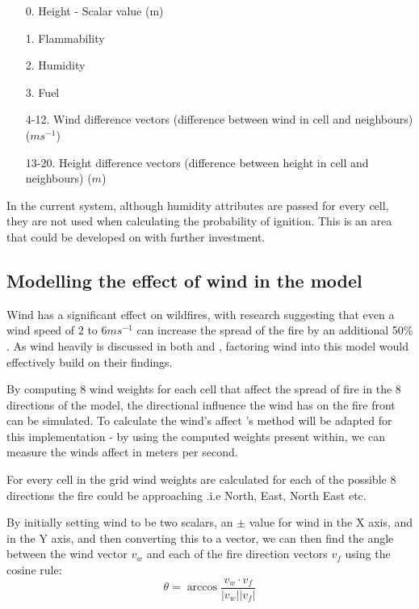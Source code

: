 \documentclass[11pt, a4paper, titlepage]{article}
\begin{document}
\begin{itemize}
  \item [0.] Height - Scalar value (m)
  \item [1.] Flammability
  \item [2.] Humidity
  \item [3.] Fuel
  \item [4-12.] Wind difference vectors (difference between wind in cell and neighbours) ($ms^{-1}$)
  \item [13-20.] Height difference vectors (difference between height in cell and neighbours) ($m$)
\end{itemize}

In the current system, although humidity attributes are passed for every cell, they are not used when calculating the probability of ignition. This is an area that could be developed on with further investment. 

\subsection{Modelling the effect of wind in the model}
Wind has a significant effect on wildfires, with research suggesting that even a wind speed of $2$ to $6ms^{-1}$ can increase the spread of the fire by an additional 50\% \cite{Beer1991}. As wind heavily is discussed in both \cite{ALEXANDRIDIS2008191} and \cite{HERNANDEZENCINAS20071213}, factoring wind into this model would effectively build on their findings.

By computing 8 wind weights for each cell that affect the spread of fire in the 8 directions of the model, the directional influence the wind has on the fire front can be simulated. To calculate the wind's affect \cite{ALEXANDRIDIS2008191}'s method will be adapted for this implementation - by using the computed weights present within, we can measure the winds affect in meters per second.

For every cell in the grid wind weights are calculated for each of the possible 8 directions the fire could be approaching .i.e North, East, North East etc.

By initially setting wind to be two scalars, an $\pm$ value for wind in the X axis, and in the Y axis, and then converting this to a vector, we can then find the angle between the wind vector $v_w$ and each of the fire direction vectors $v_f$ using the cosine rule:
\[\theta = \arccos{ \frac{v_w \cdot v_f}{|v_w||v_f|} }\]
\end{document}
